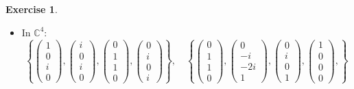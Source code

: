 \documentclass{article}
\theoremstyle{plain}
\theoremstyle{definition}
\newtheorem{xca}[exmp]{Exercise}
\theoremstyle{remark}
\begin{document}
\begin{bxthm}
\begin{xca}
\begin{itemize}
\[\begin{pmatrix}
                -2\\
                -3
            \end{pmatrix}
            \right\}\]
        \item In $\mathbb{C}^4$:
        \[\left\{
            \begin{pmatrix}
                1\\
                0\\
                i\\
                0
            \end{pmatrix},
            \begin{pmatrix}
                i\\
                0\\
                i\\
                0
            \end{pmatrix},
            \begin{pmatrix}
                0\\
                1\\
                1\\
                0
            \end{pmatrix},
            \begin{pmatrix}
                0\\
                i\\
                0\\
                i
            \end{pmatrix}
            \right\},\quad\left\{
            \begin{pmatrix}
                0\\
                1\\
                1\\
                0
            \end{pmatrix},
            \begin{pmatrix}
                0\\
                -i\\
                -2i\\
                1
            \end{pmatrix},
            \begin{pmatrix}
                0\\
                i\\
                0\\
                1
            \end{pmatrix},
            \begin{pmatrix}
                1\\
                0\\
                0\\
                0
            \end{pmatrix},
            \right\}\]
    \end{itemize}
\end{xca}
\end{bxthm}
\end{document}
